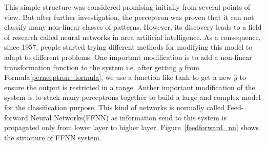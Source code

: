 \documentclass[officiallayout]{tktla}
\begin{document}
This simple structure was considered promising initially from several points of view. But after further investigation, the perceptron was proven that it can not classify many non-linear classes of patterns. However, its discovery leads to a field of research called neural networks in area artificial intelligence. As a consequence, since 1957, people started trying different methods for modifying this model to adapt to different problems. One important modification is to add a non-linear transformation function to the system i.e. after getting $y$ from Formula\ref{pernceptron_formula}, we use a function like tanh to get a new $\hat{y}$ to ensure the output is restricted in a range. Anther important modification of the system is to stack many perceptrons together to build a large and complex model for the classification purpose. This kind of networks is normally called Feed-forward Neural Networks(FFNN) as information send to this system is propagated only from lower layer to higher layer. Figure~\ref{feedforward_nn} shows the structure of FFNN system.
\end{document}

